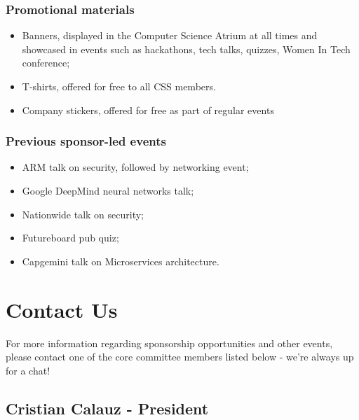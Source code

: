\documentclass{article}
\begin{document}
\setlength{\columnsep}{1cm}
\begin{multicols}{2}
\subsubsection*{Promotional materials}

\medskip

\begin{itemize}
  \item Banners, displayed in the Computer Science Atrium at all times and showcased in events such as hackathons, tech talks, quizzes, Women In Tech conference;
  \item T-shirts, offered for free to all CSS members.
  \item Company stickers, offered for free as part of regular events
\end{itemize}

\vfill\null
\columnbreak

\subsubsection*{Previous sponsor-led events}

\medskip

\begin{itemize}
  \item ARM talk on security, followed by networking event;
  \item Google DeepMind neural networks talk;
  \item Nationwide talk on security;
  \item Futureboard pub quiz;
  \item Capgemini talk on Microservices architecture.
\end{itemize}
\end{multicols}

\vfill

\fontsize{13}{14}\selectfont

\section*{Contact Us}

For more information regarding sponsorship opportunities and other events,
please contact one of the core committee members listed below - we're always
up for a chat!

\subsection*{Cristian Calauz - President}
\end{document}
